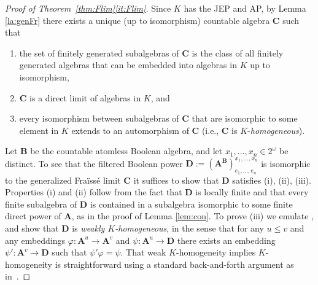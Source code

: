 \documentclass[12pt,a4paper,reqno]{amsart}
\numberwithin{equation}{section}
\theoremstyle{plain}
\theoremstyle{definition}
\newcommand{\A}{\mathbf{A}}
\newcommand{\ABxe}{(\mathbf{A^B})^{x_1,\dots,x_n}_{e_1,\dots,e_n}}
\newcommand{\B}{\mathbf{B}}
\newcommand{\C}{\mathbf{C}}
\newcommand{\D}{\mathbf{D}}
\begin{document}
\begin{proof}[Proof of Theorem~\ref{thm:Flim}\eqref{it:Flim}]
 
 Since $K$ has the JEP and AP, by Lemma \ref{la:genFr} there exists a unique (up to isomorphism) countable algebra
 $\C$ such that
\begin{enumerate}
\item[(i)] 
 the set of finitely generated subalgebras of $\C$ is the class of all finitely generated algebras that can be embedded into
 algebras in $K$ up to isomorphism,
\item[(ii)] $\C$ is a direct limit of algebras in $K$, and
\item[(iii)] every isomorphism between subalgebras of $\C$ that are isomorphic to some element in $K$
  extends to an automorphism of $\C$ (i.e., $\C$ is $K$-\emph{homogeneous}).
\end{enumerate}

Let $\B$ be the countable atomless Boolean algebra, and let $x_1,\dots,x_n\in 2^\omega$ be distinct.
 To see that the filtered Boolean power $\D:=\ABxe$
 is isomorphic to the generalized Fra{\"i}ss{\'e} limit $\C$
 it suffices to show that $\D$ satisfies (i), (ii), (iii). 
 Properties (i) and (ii) follow from the fact that $\D$ is locally finite and that every finite subalgebra of $\D$
 is contained in a subalgebra isomorphic to some finite direct power of $\A$, as in the proof of Lemma \ref{lem:con}.
To prove (iii) we emulate \cite[Lemma 7.1.4]{Ho:MT}, and show that
 $\D$ is \emph{weakly $K$-homogeneous}, in the sense that for any $u\leq v$ and
 any embeddings $\varphi\colon \A^u \to \A^v$ and $\psi\colon \A^u \to \D$ there exists an embedding
 $\psi'\colon \A^v \to \D$ such that $\psi'\varphi = \psi$.
 That weak $K$-homogeneity implies $K$-homogeneity is straightforward using a standard back-and-forth argument as in~\cite[cf. Lemma 7.1.4]{Ho:MT}.
 

\end{proof}
\end{document}
